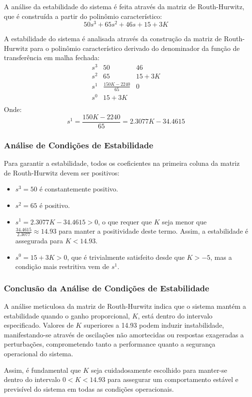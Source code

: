 A análise da estabilidade do sistema é feita através da matriz de Routh-Hurwitz, que é construída a partir do polinômio característico:
\[
    50s^3 + 65s^2 + 46s + 15 + 3K
\]

A estabilidade do sistema é analisada através da construção da matriz de Routh-Hurwitz para o polinômio característico derivado do denominador da função de transferência em malha fechada:
\[
    \begin{array}{c|cc}
        s^3 & 50                     & 46      \\
        s^2 & 65                     & 15 + 3K \\
        s^1 & \frac{150K - 2240}{65} & 0       \\
        s^0 & 15 + 3K                &         \\
    \end{array}
\]
Onde:
\[
    s^1 = \frac{150K - 2240}{65} = 2.3077K - 34.4615
\]

\subsubsection{Análise de Condições de Estabilidade}
Para garantir a estabilidade, todos os coeficientes na primeira coluna da matriz de Routh-Hurwitz devem ser positivos:
\begin{itemize}
    \item \(s^3 = 50\) é constantemente positivo.
    \item \(s^2 = 65\) é positivo.
    \item \(s^1 = 2.3077K - 34.4615 > 0\), o que requer que \(K\) seja menor que \(\frac{34.4615}{2.3077} \approx 14.93\) para manter a positividade deste termo. Assim, a estabilidade é assegurada para \(K < 14.93\).
    \item \(s^0 = 15 + 3K > 0\), que é trivialmente satisfeito desde que \(K > -5\), mas a condição mais restritiva vem de \(s^1\).
\end{itemize}

\subsubsection{Conclusão da Análise de Condições de Estabilidade}
A análise meticulosa da matriz de Routh-Hurwitz indica que o sistema mantém a estabilidade quando o ganho proporcional, \(K\), está dentro do intervalo especificado. Valores de \(K\) superiores a 14.93 podem induzir instabilidade, manifestando-se através de oscilações não amortecidas ou respostas exageradas a perturbações, comprometendo tanto a performance quanto a segurança operacional do sistema.

Assim, é fundamental que \(K\) seja cuidadosamente escolhido para manter-se dentro do intervalo \(0 < K < 14.93\) para assegurar um comportamento estável e previsível do sistema em todas as condições operacionais.